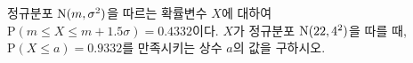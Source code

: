 정규분포 $\mathrm{N}(m{,}\mkern3mu\mathopen{}\sigma^2)$을 따르는 확률변수 $X$에 대하여 $\mathrm{P}(m\le X\le m+1.5\sigma)=0.4332$이다. $X$가 정규분포 $\mathrm{N}(22{,}\mkern3mu\mathopen{}4^2)$을 따를 때, $\mathrm{P}(X\le a)=0.9332$를 만족시키는 상수 $a$의 값을 구하시오.
